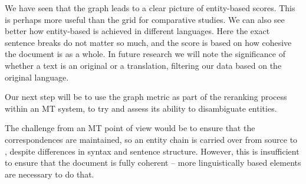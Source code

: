 \documentclass[output=paper]{langsci/langscibook.cls}
\begin{document}
We have seen that the graph leads to a clear picture of entity-based  scores. This is perhaps more useful than the grid for comparative studies. We can also see better how entity-based  is achieved in different languages. Here the exact sentence breaks do not matter so much, and the score is based on how cohesive the document is as a whole. 
In future research we will note the significance of whether a text is an original or a translation, filtering our data based on the original language. 

Our next step will be to use the graph metric as part of the reranking process within an MT system, to try and assess its ability to  disambiguate entities. 

The challenge from an MT point of view would be to ensure that the correspondences are maintained, so an entity chain is carried over from source to , despite differences in syntax and sentence structure. However, this is insufficient to ensure that the document is fully coherent -- more linguistically based elements are necessary to do that. 

% 
%
%
{\sloppy
\printbibliography[heading=subbibliography,notkeyword=this] 
}
\end{document}
